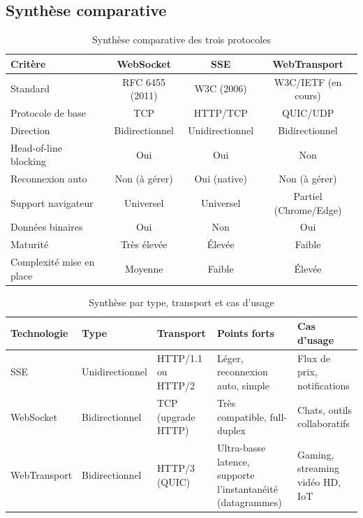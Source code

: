 \subsection{Synthèse comparative}

\begin{table}[H]
\centering
\small
\begin{tabular}{|l|c|c|c|}
\hline
\textbf{Critère} & \textbf{WebSocket} & \textbf{SSE} & \textbf{WebTransport} \\
\hline
Standard & RFC 6455 (2011) & W3C (2006) & W3C/IETF (en cours) \\
Protocole de base & TCP & HTTP/TCP & QUIC/UDP \\
Direction & Bidirectionnel & Unidirectionnel & Bidirectionnel \\
Head-of-line blocking & Oui & Oui & Non \\
Reconnexion auto & Non (à gérer) & Oui (native) & Non (à gérer) \\
Support navigateur & Universel & Universel & Partiel (Chrome/Edge) \\
Données binaires & Oui & Non & Oui \\
Maturité & Très élevée & Élevée & Faible \\
Complexité mise en place & Moyenne & Faible & Élevée \\
\hline
\end{tabular}
\caption{Synthèse comparative des trois protocoles}
\end{table}

\begin{table}[H]
\centering
\small
\begin{tabular}{|l|l|p{2.1cm}|p{2.8cm}|p{2.8cm}|}
\hline
\textbf{Technologie} & \textbf{Type} & \textbf{Transport} & \textbf{Points forts} & \textbf{Cas d'usage} \\
\hline
SSE & Unidirectionnel & HTTP/1.1 ou HTTP/2 & Léger, reconnexion auto, simple & Flux de prix, notifications \\
\hline
WebSocket & Bidirectionnel & TCP (upgrade HTTP) & Très compatible, full-duplex & Chats, outils collaboratifs \\
\hline
WebTransport & Bidirectionnel & HTTP/3 (QUIC) & Ultra-basse latence, supporte l'instantanéité (datagrammes) & Gaming, streaming vidéo HD, IoT \\
\hline
\end{tabular}
\caption{Synthèse par type, transport et cas d'usage}
\end{table}

